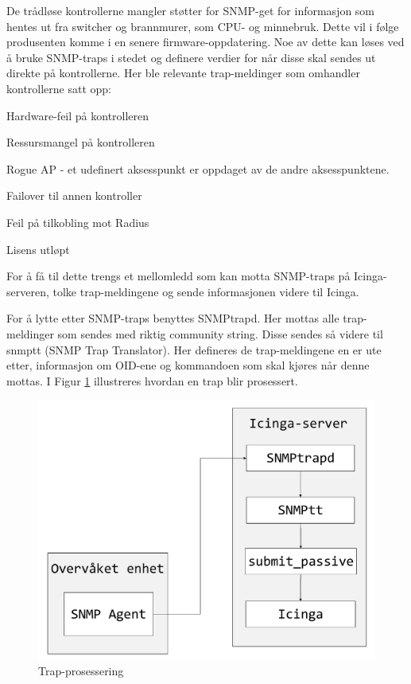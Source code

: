 De trådløse kontrollerne mangler støtter for SNMP-get for informasjon som hentes ut fra switcher og brannmurer, som CPU- og minnebruk. Dette vil i følge produsenten komme i en senere firmware-oppdatering. Noe av dette kan løses ved å bruke SNMP-traps i stedet og definere verdier for når disse skal sendes ut direkte på kontrollerne. Her ble relevante trap-meldinger som omhandler kontrollerne satt opp:
\begin{itemize*}
	\item Hardware-feil på kontrolleren
	\item Ressursmangel på kontrolleren
	\item Rogue AP - et udefinert aksesspunkt er oppdaget av de andre aksesspunktene.
	\item Failover til annen kontroller
	\item Feil på tilkobling mot Radius
	\item Lisens utløpt
\end{itemize*}

For å få til dette trengs et mellomledd som kan motta SNMP-traps på Icinga-serveren, tolke trap-meldingene og sende informasjonen videre til Icinga. 

For å lytte etter SNMP-traps benyttes SNMPtrapd\cite{snmptraps2}. Her mottas alle trap-meldinger som sendes med riktig community string. Disse sendes så videre til snmptt (SNMP Trap Translator\cite{traptranselator}). Her defineres de trap-meldingene en er ute etter, informasjon om OID-ene og kommandoen som skal kjøres når denne mottas. I Figur \ref{snmptrap} illustreres hvordan en trap blir prosessert. 

\begin{figure}[H]
    \centering
    \includegraphics[scale=0.4]{img/SNMPtrap}
    \caption{Trap-prosessering}
    \label{snmptrap}
\end{figure}

